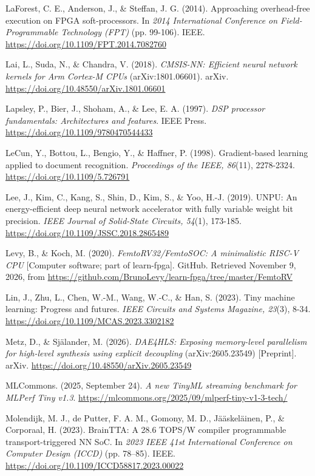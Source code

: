 \begin{apareferences}
LaForest, C. E., Anderson, J., \& Steffan, J. G. (2014). Approaching overhead-free execution on FPGA soft-processors. In \emph{2014 International Conference on Field-Programmable Technology (FPT)} (pp. 99-106). IEEE. \url{https://doi.org/10.1109/FPT.2014.7082760}

Lai, L., Suda, N., \& Chandra, V. (2018). \emph{CMSIS-NN: Efficient neural network kernels for Arm Cortex-M CPUs} (arXiv:1801.06601). arXiv. \url{https://doi.org/10.48550/arXiv.1801.06601}

Lapsley, P., Bier, J., Shoham, A., \& Lee, E. A. (1997). \emph{DSP processor fundamentals: Architectures and features}. IEEE Press. \url{https://doi.org/10.1109/9780470544433}

LeCun, Y., Bottou, L., Bengio, Y., \& Haffner, P. (1998). Gradient-based learning applied to document recognition. \emph{Proceedings of the IEEE, 86}(11), 2278-2324. \url{https://doi.org/10.1109/5.726791}

Lee, J., Kim, C., Kang, S., Shin, D., Kim, S., \& Yoo, H.-J. (2019). UNPU: An energy-efficient deep neural network accelerator with fully variable weight bit precision. \emph{IEEE Journal of Solid-State Circuits, 54}(1), 173-185. \url{https://doi.org/10.1109/JSSC.2018.2865489}

Levy, B., \& Koch, M. (2020). \emph{FemtoRV32/FemtoSOC: A minimalistic RISC-V CPU} {[}Computer software; part of learn-fpga{]}. GitHub. Retrieved November 9, 2026, from \url{https://github.com/BrunoLevy/learn-fpga/tree/master/FemtoRV}

Lin, J., Zhu, L., Chen, W.-M., Wang, W.-C., \& Han, S. (2023). Tiny machine learning: Progress and futures. \emph{IEEE Circuits and Systems Magazine, 23}(3), 8-34. \url{https://doi.org/10.1109/MCAS.2023.3302182}

Metz, D., \& Själander, M. (2026). \emph{DAE4HLS: Exposing memory-level parallelism for high-level synthesis using explicit decoupling} (arXiv:2605.23549) {[}Preprint{]}. arXiv. \url{https://doi.org/10.48550/arXiv.2605.23549}

MLCommons. (2025, September 24). \emph{A new TinyML streaming benchmark for MLPerf Tiny v1.3}. \url{https://mlcommons.org/2025/09/mlperf-tiny-v1-3-tech/}

Molendijk, M. J., de Putter, F. A. M., Gomony, M. D., Jääskeläinen, P., \& Corporaal, H. (2023). BrainTTA: A 28.6 TOPS/W compiler programmable transport-triggered NN SoC. In \emph{2023 IEEE 41st International Conference on Computer Design (ICCD)} (pp. 78–85). IEEE. \url{https://doi.org/10.1109/ICCD58817.2023.00022}


\end{apareferences}
